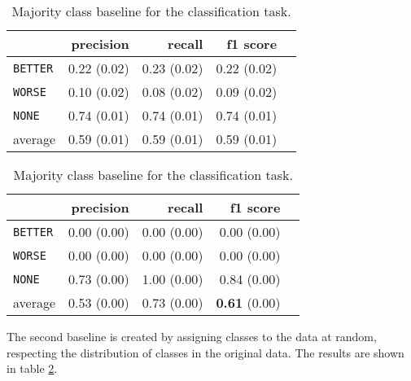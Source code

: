 \begin{table}[!htb]
    \begin{minipage}{.5\linewidth}
      \caption{Random (stratified) baseline for the classification task.}
      \label{tbl:3stratifiedbaseline}
      \centering
      
\begin{tabular}{@{}lrrrr@{}}
\toprule
 	&	 precision &	 recall &	 f1 score  \\ \midrule 
\texttt{BETTER}	&	 0.22 \scriptsize{(0.02)} &	 0.23 \scriptsize{(0.02)} &	 0.22 \scriptsize{(0.02)}  \\ 
\texttt{WORSE}	&	 0.10 \scriptsize{(0.02)} &	 0.08 \scriptsize{(0.02)} &	 0.09 \scriptsize{(0.02)}  \\ 
\texttt{NONE}	&	 0.74 \scriptsize{(0.01)} &	 0.74 \scriptsize{(0.01)} &	 0.74 \scriptsize{(0.01)}  \\ 
average	&	 0.59 \scriptsize{(0.01)} &	 0.59 \scriptsize{(0.01)} &	 0.59 \scriptsize{(0.01)}  \\ 
\bottomrule
\end{tabular} 

  \end{minipage}%
    \begin{minipage}{.5\linewidth}
      \centering
        \caption{Majority class baseline for the classification task.}
        \label{tbl:3majoritybaseline}
\begin{tabular}{@{}lrrrr@{}}
\toprule
 	&	 precision &	 recall &	 f1 score  \\ \midrule 
\texttt{BETTER}	&	 0.00 \scriptsize{(0.00)} &	 0.00 \scriptsize{(0.00)} &	 0.00 \scriptsize{(0.00)}  \\ 
\texttt{WORSE}	&	 0.00 \scriptsize{(0.00)} &	 0.00 \scriptsize{(0.00)} &	 0.00 \scriptsize{(0.00)}  \\ 
\texttt{NONE}	&	 0.73 \scriptsize{(0.00)} &	 1.00 \scriptsize{(0.00)} &	 0.84 \scriptsize{(0.00)}  \\ 
average	&	 0.53 \scriptsize{(0.00)} &	 0.73 \scriptsize{(0.00)} &	 \textbf{0.61} \scriptsize{(0.00)}  \\ 
\bottomrule
\end{tabular}
    \end{minipage} 
\end{table}



The second baseline is created by assigning classes to the data at random, respecting the distribution of classes in the original data. The results are shown in table \ref{tbl:3majoritybaseline}.

